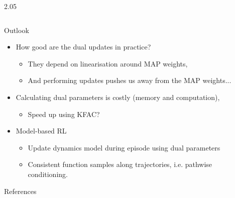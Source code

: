 \documentclass[final,12pt]{beamer}
\newlength{\sepwidth}
\newlength{\colwidth}
\newcommand{\separatorcolumn}{\begin{column}{\sepwidth}\end{column}}
\begin{document}
\begin{frame}[t]
\begin{columns}[t]
\begin{column}{2.05\colwidth}
\begin{columns}[t]
\begin{column}{\colwidth}
\begin{block}{Outlook}
   \begin{itemize}
     \item How good are the dual updates in practice?
    \begin{itemize}
        \item They depend on linearisation around MAP weights,
        \item And performing updates pushes us away from the MAP weights...
    \end{itemize}
     \item Calculating dual parameters is costly (memory and computation),
    \begin{itemize}
        \item Speed up using KFAC?
    \end{itemize}
     \item Model-based RL
    \begin{itemize}
        \item Update dynamics model during episode using dual parameters
        \item Consistent function samples along trajectories, i.e. pathwise conditioning.
    \end{itemize}
   \end{itemize}

  \end{block}

  \vspace*{1em}

  \nocite{*} %

  \begin{block}{References}
    \vspace*{-.25em}
    \footnotesize{}
  \end{block}

\end{column}

\end{columns}

\end{column}

\separatorcolumn

\end{columns}

\end{frame}
\end{document}

